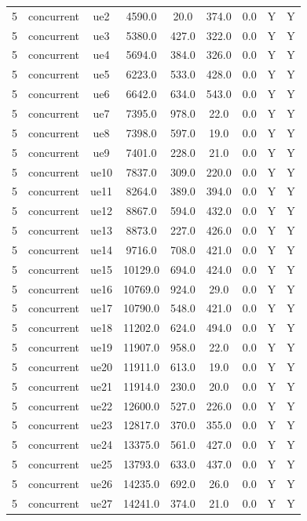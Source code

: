 \begin{table}[ht]
\begin{tabular}{|c|c|c|c|c|c|c|c|c|}
5 & concurrent & ue2 & 4590.0 & 20.0 & 374.0 & 0.0 & Y & Y \\
5 & concurrent & ue3 & 5380.0 & 427.0 & 322.0 & 0.0 & Y & Y \\
5 & concurrent & ue4 & 5694.0 & 384.0 & 326.0 & 0.0 & Y & Y \\
5 & concurrent & ue5 & 6223.0 & 533.0 & 428.0 & 0.0 & Y & Y \\
5 & concurrent & ue6 & 6642.0 & 634.0 & 543.0 & 0.0 & Y & Y \\
5 & concurrent & ue7 & 7395.0 & 978.0 & 22.0 & 0.0 & Y & Y \\
5 & concurrent & ue8 & 7398.0 & 597.0 & 19.0 & 0.0 & Y & Y \\
5 & concurrent & ue9 & 7401.0 & 228.0 & 21.0 & 0.0 & Y & Y \\
5 & concurrent & ue10 & 7837.0 & 309.0 & 220.0 & 0.0 & Y & Y \\
5 & concurrent & ue11 & 8264.0 & 389.0 & 394.0 & 0.0 & Y & Y \\
5 & concurrent & ue12 & 8867.0 & 594.0 & 432.0 & 0.0 & Y & Y \\
5 & concurrent & ue13 & 8873.0 & 227.0 & 426.0 & 0.0 & Y & Y \\
5 & concurrent & ue14 & 9716.0 & 708.0 & 421.0 & 0.0 & Y & Y \\
5 & concurrent & ue15 & 10129.0 & 694.0 & 424.0 & 0.0 & Y & Y \\
5 & concurrent & ue16 & 10769.0 & 924.0 & 29.0 & 0.0 & Y & Y \\
5 & concurrent & ue17 & 10790.0 & 548.0 & 421.0 & 0.0 & Y & Y \\
5 & concurrent & ue18 & 11202.0 & 624.0 & 494.0 & 0.0 & Y & Y \\
5 & concurrent & ue19 & 11907.0 & 958.0 & 22.0 & 0.0 & Y & Y \\
5 & concurrent & ue20 & 11911.0 & 613.0 & 19.0 & 0.0 & Y & Y \\
5 & concurrent & ue21 & 11914.0 & 230.0 & 20.0 & 0.0 & Y & Y \\
5 & concurrent & ue22 & 12600.0 & 527.0 & 226.0 & 0.0 & Y & Y \\
5 & concurrent & ue23 & 12817.0 & 370.0 & 355.0 & 0.0 & Y & Y \\
5 & concurrent & ue24 & 13375.0 & 561.0 & 427.0 & 0.0 & Y & Y \\
5 & concurrent & ue25 & 13793.0 & 633.0 & 437.0 & 0.0 & Y & Y \\
5 & concurrent & ue26 & 14235.0 & 692.0 & 26.0 & 0.0 & Y & Y \\
5 & concurrent & ue27 & 14241.0 & 374.0 & 21.0 & 0.0 & Y & Y \\

\end{tabular}
\end{table}
